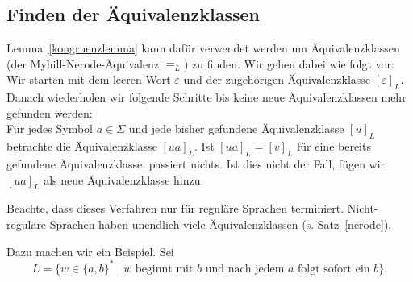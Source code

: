 \documentclass[11pt, a4paper]{article}
\theoremstyle{definition}
\theoremstyle{plain}
\begin{document}
\subsection*{Finden der Äquivalenzklassen}
Lemma~\ref{kongruenzlemma} kann dafür verwendet werden um Äquivalenzklassen (der Myhill-Nerode-Ä\-qui\-va\-lenz \( \equiv_L \)) zu finden. Wir gehen dabei wie folgt vor:\\
Wir starten mit dem leeren Wort \( \varepsilon \) und der zugehörigen Äquivalenzklasse \( [\varepsilon]_L \). Danach wiederholen wir folgende Schritte bis keine neue Äquivalenzklassen mehr gefunden werden:\\
Für jedes Symbol \( a \in \Sigma \) und jede bisher gefundene Äquivalenzklasse \( [u]_L \) betrachte die Äquivalenzklasse \( [ua]_L \). Ist \( [ua]_L = [v]_L \) für eine bereits gefundene Äquivalenzklasse, passiert nichts. Ist dies nicht der Fall, fügen wir \( [ua]_L \) als neue Äquivalenzklasse hinzu.\par
Beachte, dass dieses Verfahren nur für reguläre Sprachen terminiert. Nicht-reguläre Sprachen haben unendlich viele Äquivalenzklassen (s. Satz~\ref{nerode}).\par
Dazu machen wir ein Beispiel. Sei 
\[
	L = \{ w \in \{ a, b \}^\ast \mid w \text{ beginnt mit } b \text{ und nach jedem } a \text{ folgt sofort ein } b \}.
\]
\end{document}
